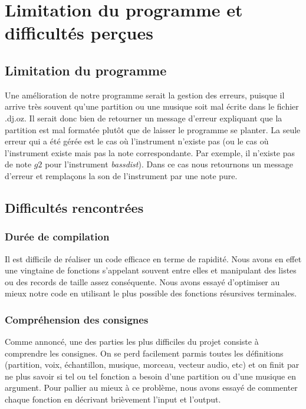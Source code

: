 \documentclass[10pt,a4paper]{article}
\begin{document}
\section{Limitation du programme et difficultés perçues}
\subsection{Limitation du programme}
Une amélioration de notre programme serait la gestion des erreurs, 
puisque il arrive très souvent qu'une partition ou une musique soit mal écrite dans le fichier .dj.oz.
Il serait donc bien de retourner un message d'erreur expliquant que la partition est mal formatée 
plutôt que de laisser le programme se planter.
La seule erreur qui a été gérée est le cas où l'instrument n'existe pas (ou le cas où l'instrument
existe mais pas la note correspondante. Par exemple, il n'existe pas de note $g2$ pour 
l'instrument \textit{bassdist}). Dans ce cas nous retournons un message
d'erreur et remplaçons la son de l'instrument par une note pure.

\subsection{Difficultés rencontrées}
\subsubsection{Durée de compilation}
Il est difficile de réaliser un code efficace en terme de rapidité. Nous avons en effet une
vingtaine de fonctions s'appelant souvent entre elles et manipulant des listes
ou des records de taille assez conséquente. Nous avons essayé d'optimiser au mieux notre
code en utilisant le plus possible des fonctions résursives terminales.

\subsubsection{Compréhension des consignes}
Comme annoncé, une des parties les plus difficiles du projet consiste à 
comprendre les consignes. On se perd facilement parmis toutes les définitions
(partition, voix, échantillon, musique, morceau, vecteur audio, etc) et on finit
par ne plus savoir si tel ou tel fonction a besoin d'une partition ou d'une musique
en argument. Pour pallier au mieux à ce problème, nous avons essayé de commenter
chaque fonction en décrivant brièvement l'input et l'output. 
\newpage
\end{document}
